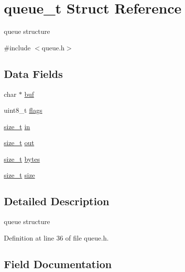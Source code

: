 \hypertarget{structqueue__t}{}\section{queue\+\_\+t Struct Reference}
\label{structqueue__t}


queue structure  




{\ttfamily \#include $<$queue.\+h$>$}

\subsection*{Data Fields}
\begin{DoxyCompactItemize}
\item 
char $\ast$ \hyperlink{structqueue__t_aaee81421d150a17123a2b858d5b1685d}{buf}
\item 
uint8\+\_\+t \hyperlink{structqueue__t_a2a516773a572c746d461c9df3cb30387}{flags}
\item 
\hyperlink{hardware_2user__config_8h_aea0c7eab1ce1eebb4e879ef4e23c16ee}{size\+\_\+t} \hyperlink{structqueue__t_a7a6832e36c70a1db7fddc93fb6be9d63}{in}
\item 
\hyperlink{hardware_2user__config_8h_aea0c7eab1ce1eebb4e879ef4e23c16ee}{size\+\_\+t} \hyperlink{structqueue__t_a8f6e1c623d2ceed398a71a0aab93b0fa}{out}
\item 
\hyperlink{hardware_2user__config_8h_aea0c7eab1ce1eebb4e879ef4e23c16ee}{size\+\_\+t} \hyperlink{structqueue__t_a58398d4ee60bc90ffba2bc3488fe185b}{bytes}
\item 
\hyperlink{hardware_2user__config_8h_aea0c7eab1ce1eebb4e879ef4e23c16ee}{size\+\_\+t} \hyperlink{structqueue__t_a83a13b888f9d4ef127d706559818b779}{size}
\end{DoxyCompactItemize}


\subsection{Detailed Description}
queue structure 

Definition at line 36 of file queue.\+h.



\subsection{Field Documentation}
\mbox{\label{structqueue__t_aaee81421d150a17123a2b858d5b1685d}} 
